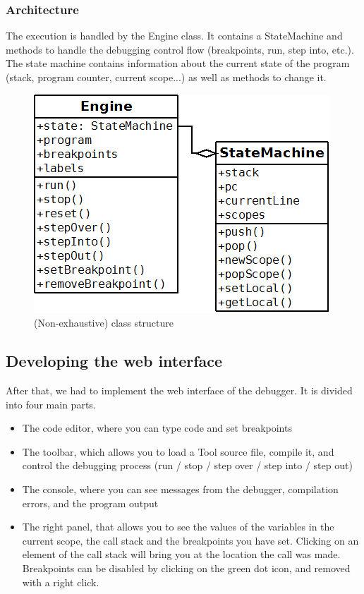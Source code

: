 \subsubsection{Architecture}

The execution is handled by the Engine class. It contains a StateMachine and methods to handle the debugging control flow (breakpoints, run, step into, etc.).
The state machine contains information about the current state of the program (stack, program counter, current scope...) as well as methods to change it.\\

\begin{figure}[h]
  \centering
    \includegraphics[scale=0.6]{diag.png}
     \caption{(Non-exhaustive) class structure}
\end{figure}

\subsection{Developing the web interface}

After that, we had to implement the web interface of the debugger. It is divided into four main parts.

\begin{itemize}
\item The code editor, where you can type code and set breakpoints
\item The toolbar, which allows you to load a Tool source file, compile it, and control the debugging process (run / stop / step over / step into / step out)
\item The console, where you can see messages from the debugger, compilation errors, and the program output
\item The right panel, that allows you to see the values of the variables in the current scope, the call stack and the breakpoints you have set. Clicking on an element of the call stack will bring you at the location the call was made. Breakpoints can be disabled by clicking on the green dot icon, and removed with a right click.
\end{itemize}

